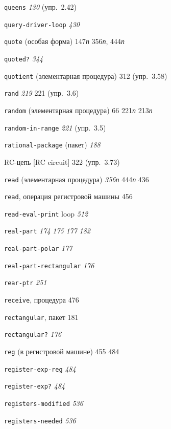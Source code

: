\begin{theindex}
\item {\texttt{queens}} {\it 130} (упр.~2.42)
\item {\texttt{query-driver-loop}} {\it 430}
\item {\texttt{quote} (особая форма)} 147{\it п}
   356{\it п}, 444{\it п}
\item {\texttt{quoted?}} {\it 344}
\item {\texttt{quotient} (элементарная процедура)} 312 (упр.~3.58)
\bigskip
\item {\texttt{rand}} {\it 219}
   221 (упр.~3.6)
\item {\texttt{random} (элементарная процедура)} 66
   221{\it п}
   213{\it п}
\item {\texttt{random-in-range}} {\it 221} (упр.~3.5)
\item {\texttt{rational-package} (пакет)} {\it 188}
\item {RC-цепь [RC circuit]} 322 (упр.~3.73)
\item {\texttt{read} (элементарная процедура)} {\it 356}{\it п}
   444{\it п}
   436
\item {\texttt{read}, операция регистровой машины} 456
\item {\texttt{read-eval-print} loop} {\it 512}
\item {\texttt{real-part}}
   {\it 174}
   {\it 175}
   {\it 177}
   {\it 182}
\item {\texttt{real-part-polar}} {\it 177}
\item {\texttt{real-part-rectangular}} {\it 176}
\item {\texttt{rear-ptr}} {\it 251}
\item {\texttt{receive}, процедура} 476
\item {\texttt{rectangular}, пакет} 181
\item {\texttt{rectangular?}} {\it 176}
\item {\texttt{reg} (в регистровой машине)} 455
   484
\item {\texttt{register-exp-reg}} {\it 484}
\item {\texttt{register-exp?}} {\it 484}
\item {\texttt{registers-modified}} {\it 536}
\item {\texttt{registers-needed}} {\it 536}

\end{theindex}
